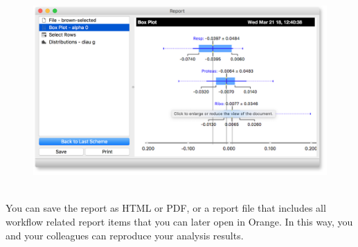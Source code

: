 \begin{figure}[h]
  \centering
  \includegraphics[width=\linewidth]{saving-fig2.png}%
  \caption{$\;$}
  \label{fig:saveing-fig2}
\end{figure}

You can save the report as HTML or PDF, or a report file that includes all workflow related report items that you can later open in Orange. In this way, you and your colleagues can reproduce your analysis results.